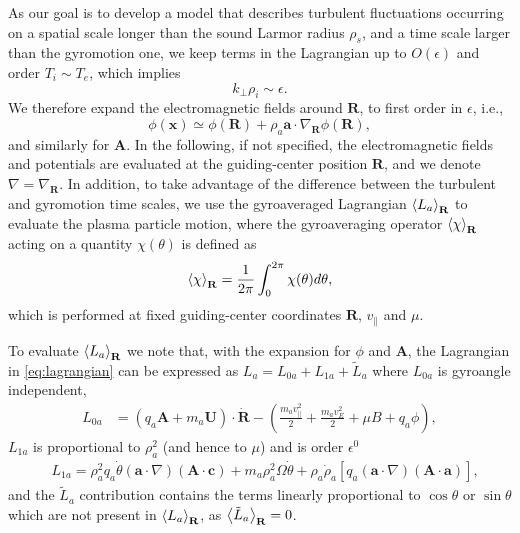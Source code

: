 As our goal is to develop a model that describes turbulent fluctuations occurring on a spatial scale longer than the sound Larmor radius $\rho_s$, and a time scale larger than the gyromotion one, we keep terms in the Lagrangian up to $O(\epsilon)$ and order $T_i \sim T_e$, which implies
%
\begin{equation}
    k_{\perp} \rho_i \sim \epsilon.
    \label{eq:tiordering}
\end{equation}
%
We therefore expand the electromagnetic fields around $\mathbf R$, to first order in $\epsilon$, i.e.,
%
\begin{equation}
    \phi(\mathbf x) \simeq \phi(\mathbf R) + \rho_a \mathbf a \cdot \nabla_{\mathbf R} \phi(\mathbf R),
    \label{eq:FLRexp}
\end{equation}
%
and similarly for $\mathbf A$. In the following, if not specified, the electromagnetic fields and potentials are evaluated at the guiding-center position $\mathbf R$, and we denote $\nabla=\nabla_{\mathbf R}$.
In addition, to take advantage of the difference between the turbulent and gyromotion time scales, we use the gyroaveraged Lagrangian $\left< L_a \right>_{\mathbf R}$ to evaluate the plasma particle motion, where the gyroaveraging operator $\left< \chi \right>_{\mathbf R}$ acting on a quantity $\chi(\theta)$ is defined as
%
\begin{equation}
    \left< \chi \right>_{\mathbf R} = \frac{1}{2\pi}\int_0^{2\pi} \chi (\theta) d\theta,
\label{gyaveroperator}
\end{equation}
%
which is performed at fixed guiding-center coordinates $\mathbf R$, $v_\parallel$ and $\mu$.

To evaluate $\left< L_a \right>_{\mathbf R}$ we note that, with the expansion for $\phi$ and $\mathbf A$, the Lagrangian in \cref{eq:lagrangian} can be expressed as $L_a=L_{0a}+L_{1a}+\tilde L_a$ where $L_{0a}$ is gyroangle independent,
%
\begin{equation}
    \begin{split}
        L_{0a} &= \left(q_a \mathbf A + m_a \mathbf U\right)\cdot \dot{\mathbf R}-\left(\frac{m_a v_\parallel^2}{2}+\frac{m_a v_E^2}{2}+\mu B+q_a \phi\right),
    \end{split}
    \label{eq:L0}
\end{equation}
%
$L_{1a}$ is proportional to $\rho_a^2$ (and hence to $\mu$) and is order $\epsilon^0$
%
\begin{equation}
    \begin{split}
        &L_{1a} = \rho_a^2 q_a \dot \theta \left(\mathbf a \cdot \nabla\right) \left(\mathbf A \cdot \mathbf c\right)+m_a \rho_a^2 \Omega \dot \theta+{\rho_a \dot \rho_a}\left[q_a \left(\mathbf a \cdot \nabla\right)\left(\mathbf A \cdot \mathbf a\right)\right],
    \end{split}
    \label{eq:L2}
\end{equation}
%
and the $\tilde L_{a}$ contribution contains the terms {linearly proportional to $\cos \theta$ or $\sin \theta$} \citep{Cary2009} {which are not present in $\left< L_a \right>_{\mathbf R}$, as $\left< \tilde L_a \right>_{\mathbf R} = 0$}.

